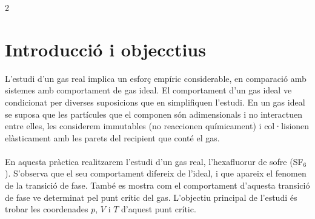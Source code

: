 \documentclass[12pt,twosides,onecolumn,openany]{article}
\begin{document}
\begin{multicols}{2}
\section{Introducció i objecctius}
L'estudi d'un gas real implica un esforç empíric considerable, en comparació amb sistemes amb comportament de gas ideal. El comportament d'un gas ideal ve condicionat per diverses suposicions que en simplifiquen l'estudi. En un gas ideal se suposa que les partícules que el componen són adimensionals i no interactuen entre elles, les considerem immutables (no reaccionen químicament) i col·lisionen elàsticament amb les parets del recipient que conté el gas.\\\\
En aquesta pràctica realitzarem l'estudi d'un gas real, l'hexafluorur de sofre (SF$_6$). S'observa que el seu comportament difereix de l'ideal, i que apareix el fenomen de la transició de fase. També es mostra com el comportament d'aquesta transició de fase ve determinat pel punt crític del gas. L'objectiu principal de l'estudi és trobar les coordenades $p$, $V$ i $T$ d'aquest punt crític.

\end{multicols}
\end{document}

